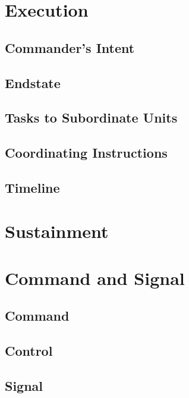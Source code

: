 \documentclass[12pt,letterpaper,notitlepage]{article}
\begin{document}
\section{Execution}
\subsection{Commander's Intent}
\subsection{Endstate}
\subsection{Tasks to Subordinate Units}
\subsection{Coordinating Instructions}
\subsection{Timeline}

\section{Sustainment}

\section{Command and Signal}
\subsection{Command}
\subsection{Control}
\subsection{Signal}
\end{document}
